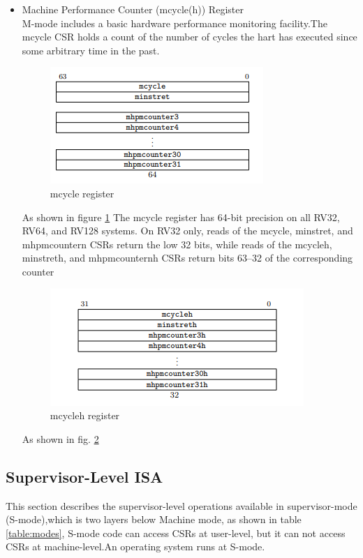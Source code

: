 \documentclass[../main.tex]{subfiles}
\begin{document}
\begin{itemize}
    \item Machine Performance Counter (mcycle(h)) Register \\
        M-mode includes a basic hardware performance monitoring facility.The mcycle CSR holds a count of the number of cycles the hart has executed since some arbitrary time in the past. 
        \begin{figure}[h]
            \centering
            \includegraphics[width=10 cm]{diagrams/mcycle.PNG}
            \caption{mcycle register}
            \label{fig:mcycle}
        \end{figure}
        As shown in figure \ref{fig:mcycle} The mcycle register has 64-bit precision on all RV32, RV64, and RV128 systems. On RV32 only, reads of the mcycle, minstret, and mhpmcountern CSRs return the low 32 bits, while reads of the mcycleh, minstreth, and mhpmcounternh CSRs return bits 63–32 of the corresponding counter\\
        \begin{figure}[h]
            \centering
            \includegraphics[width=10 cm]{diagrams/mcycleh.PNG}
            \caption{mcycleh register}
            \label{fig:mcycleh}
        \end{figure}As shown in fig. \ref{fig:mcycleh}

\end{itemize}
\subsection{Supervisor-Level ISA}
This section describes the supervisor-level operations available in supervisor-mode (S-mode),which is two layers below Machine mode, as shown in table \ref{table:modes}, S-mode code can access CSRs at user-level, but it can not access CSRs at machine-level.An operating system runs at S-mode.
\end{document}
